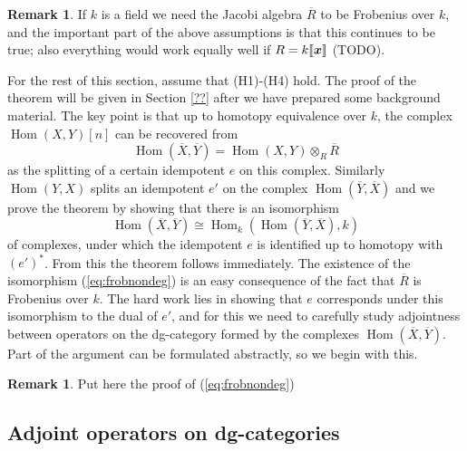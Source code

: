 \documentclass{compositio}
\theoremstyle{definition}
\newtheorem{remark}[theorem]{Remark}
\numberwithin{equation}{section}
\def\Hom{\operatorname{Hom}}
\begin{document}
\begin{remark} If $k$ is a field we need the Jacobi algebra $\overline{R}$ to be Frobenius over $k$, and the important part of the above assumptions is that this continues to be true; also everything would work equally well if $R = k\llbracket \boldsymbol{x} \rrbracket$ (TODO).
\end{remark}

For the rest of this section, assume that (H1)-(H4) hold. The proof of the theorem will be given in Section \ref{??} after we have prepared some background material. The key point is that up to homotopy equivalence over $k$, the complex $\Hom(X,Y)[n]$ can be recovered from
\[
\Hom(\overline{X},\overline{Y}) = \Hom(X,Y) \otimes_R \overline{R}
\]
as the splitting of a certain idempotent $e$ on this complex. Similarly $\Hom(Y,X)$ splits an idempotent $e'$ on the complex $\Hom(\overline{Y}, \overline{X})$ and we prove the theorem by showing that there is an isomorphism
\begin{equation}\label{eq:frobnondeg}
\Hom(\overline{X}, \overline{Y}) \cong \Hom_k( \Hom(\overline{Y}, \overline{X}), k)
\end{equation}
of complexes, under which the idempotent $e$ is identified up to homotopy with $(e')^*$. From this the theorem follows immediately. The existence of the isomorphism (\ref{eq:frobnondeg}) is an easy consequence of the fact that $\overline{R}$ is Frobenius over $k$. The hard work lies in showing that $e$ corresponds under this isomorphism to the dual of $e'$, and for this we need to carefully study adjointness between operators on the dg-category formed by the complexes $\Hom(\overline{X}, \overline{Y})$. Part of the argument can be formulated abstractly, so we begin with this.

\begin{remark} Put here the proof of (\ref{eq:frobnondeg})
\end{remark}

\subsection{Adjoint operators on dg-categories}
\end{document}
